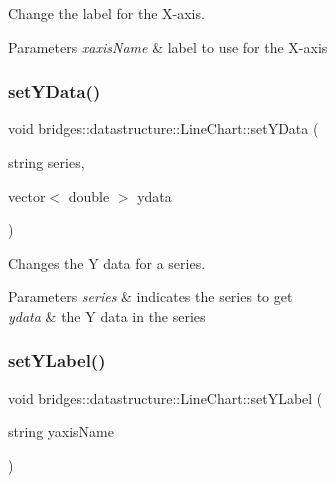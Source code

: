 Change the label for the X-\/axis. 


\begin{DoxyParams}{Parameters}
{\em xaxis\+Name} & label to use for the X-\/axis \\
\hline
\end{DoxyParams}
\mbox{\label{classbridges_1_1datastructure_1_1_line_chart_a861370f3f7b32cc1a9347727d084d307}} 
\subsubsection{\texorpdfstring{set\+Y\+Data()}{setYData()}}
{\footnotesize\ttfamily void bridges\+::datastructure\+::\+Line\+Chart\+::set\+Y\+Data (\begin{DoxyParamCaption}\item[{string}]{series,  }\item[{vector$<$ double $>$}]{ydata }\end{DoxyParamCaption})\hspace{0.3cm}{\ttfamily [inline]}}



Changes the Y data for a series. 


\begin{DoxyParams}{Parameters}
{\em series} & indicates the series to get \\
\hline
{\em ydata} & the Y data in the series \\
\hline
\end{DoxyParams}
\mbox{\label{classbridges_1_1datastructure_1_1_line_chart_ac41be5abf80052f1ace777072845a9d0}} 
\subsubsection{\texorpdfstring{set\+Y\+Label()}{setYLabel()}}
{\footnotesize\ttfamily void bridges\+::datastructure\+::\+Line\+Chart\+::set\+Y\+Label (\begin{DoxyParamCaption}\item[{string}]{yaxis\+Name }\end{DoxyParamCaption})\hspace{0.3cm}{\ttfamily [inline]}}



